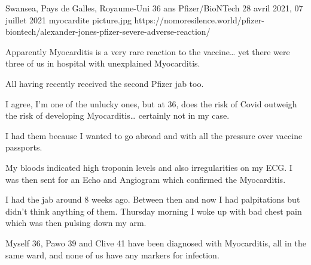           {Swansea, Pays de Galles, Royaume-Uni}
          {36 ans}
          {Pfizer/BioNTech}
          {28 avril 2021, 07 juillet 2021}
          {myocardite}
          {picture.jpg}
          {https://nomoresilence.world/pfizer-biontech/alexander-jones-pfizer-severe-adverse-reaction/}
          {

Apparently Myocarditis is a very rare reaction to the vaccine… yet there were
three of us in hospital with unexplained Myocarditis.

All having recently received the second Pfizer jab too.

I agree, I’m one of the unlucky ones, but at 36, does the risk of Covid outweigh
the risk of developing Myocarditis… certainly not in my case.

I had them because I wanted to go abroad and with all the pressure over vaccine
passports.

My bloods indicated high troponin levels and also irregularities on my ECG. I
was then sent for an Echo and Angiogram which confirmed the Myocarditis.

I had the jab around 8 weeks ago. Between then and now I had palpitations but
didn’t think anything of them. Thursday morning I woke up with bad chest pain
which was then pulsing down my arm.

Myself 36, Pawo 39 and Clive 41 have been diagnosed with Myocarditis, all in the
same ward, and none of us have any markers for infection.

}
